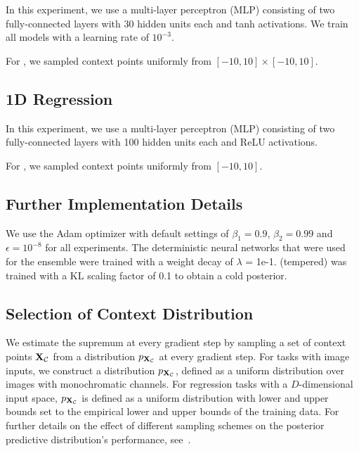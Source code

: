 \begin{appendices}
In this experiment, we use a multi-layer perceptron (MLP) consisting of two fully-connected layers with 30 hidden units each and tanh activations.
We train all models with a learning rate of $10^{-3}$.

For \fsvi, we sampled context points uniformly from $[-10,10] \times [-10,10]$.



\vspace*{-5pt}
\subsection{1D Regression}

In this experiment, we use a multi-layer perceptron (MLP) consisting of two fully-connected layers with 100 hidden units each and ReLU activations.

For \fsvi, we sampled context points uniformly from $[-10,10]$.




\vspace*{-5pt}
\subsection{Further Implementation Details}

We use the Adam optimizer with default settings of $\beta_1 = 0.9$, $\beta_2 = 0.99$ and $\epsilon = 10^{-8}$ for all experiments.
The deterministic neural networks that were used for the ensemble were trained with a weight decay of $\lambda$ = 1e-1.
\mfvi (tempered) was trained with a KL scaling factor of 0.1 to obtain a cold posterior.


\vspace*{-5pt}
\subsection{Selection of Context Distribution}
\label{appsec:inducing_inputs}

We estimate the supremum at every gradient step by sampling a set of context points $\mathbf X_{\mathcal{C}}$ from a distribution $p_{\mathbf X_{\mathcal{C}}}$ at every gradient step.
For tasks with image inputs, we construct a distribution $p_{\mathbf X_{\mathcal{C}}}$, defined as a uniform distribution over images with monochromatic channels.
For regression tasks with a $D$-dimensional input space, $p_{\mathbf X_{\mathcal{C}}}$ is defined as a uniform distribution with lower and upper bounds set to the empirical lower and upper bounds of the training data.
For further details
on the effect of different sampling schemes on the posterior predictive distribution's performance,
see~.


\end{appendices}
